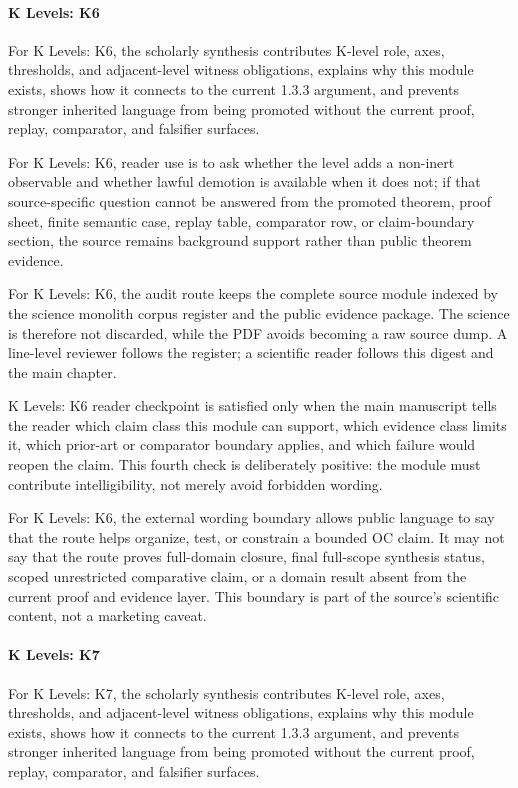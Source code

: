 \paragraph{K Levels: K6}

For K Levels: K6, the scholarly synthesis contributes K-level role, axes, thresholds, and adjacent-level witness obligations, explains why this module exists, shows how it connects to the current 1.3.3 argument, and prevents stronger inherited language from being promoted without the current proof, replay, comparator, and falsifier surfaces.


For K Levels: K6, reader use is to ask whether the level adds a non-inert observable and whether lawful demotion is available when it does not; if that source-specific question cannot be answered from the promoted theorem, proof sheet, finite semantic case, replay table, comparator row, or claim-boundary section, the source remains background support rather than public theorem evidence.


For K Levels: K6, the audit route keeps the complete source module indexed by the science monolith corpus register and the public evidence package. The science is therefore not discarded, while the PDF avoids becoming a raw source dump. A line-level reviewer follows the register; a scientific reader follows this digest and the main chapter.


K Levels: K6 reader checkpoint is satisfied only when the main manuscript tells the reader which claim class this module can support, which evidence class limits it, which prior-art or comparator boundary applies, and which failure would reopen the claim. This fourth check is deliberately positive: the module must contribute intelligibility, not merely avoid forbidden wording.


For K Levels: K6, the external wording boundary allows public language to say that the route helps organize, test, or constrain a bounded OC claim. It may not say that the route proves full-domain closure, final full-scope synthesis status, scoped unrestricted comparative claim, or a domain result absent from the current proof and evidence layer. This boundary is part of the source's scientific content, not a marketing caveat.


\paragraph{K Levels: K7}

For K Levels: K7, the scholarly synthesis contributes K-level role, axes, thresholds, and adjacent-level witness obligations, explains why this module exists, shows how it connects to the current 1.3.3 argument, and prevents stronger inherited language from being promoted without the current proof, replay, comparator, and falsifier surfaces.


